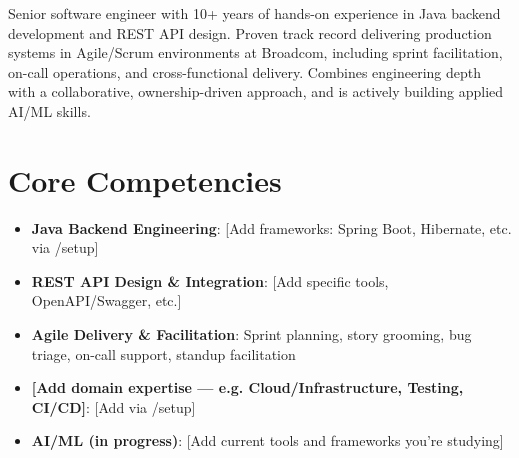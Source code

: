 \documentclass[11pt,a4paper,sans]{moderncv}
\begin{document}
\makecvtitle


\vspace{6pt}
\small{Senior software engineer with 10+ years of hands-on experience in Java backend development and REST API design. Proven track record delivering production systems in Agile/Scrum environments at Broadcom, including sprint facilitation, on-call operations, and cross-functional delivery. Combines engineering depth with a collaborative, ownership-driven approach, and is actively building applied AI/ML skills.}


\section{Core Competencies}
\vspace{1pt}
\begin{itemize}

\item \textbf{Java Backend Engineering}: [Add frameworks: Spring Boot, Hibernate, etc. via /setup]

\item \textbf{REST API Design \& Integration}: [Add specific tools, OpenAPI/Swagger, etc.]

\item \textbf{Agile Delivery \& Facilitation}: Sprint planning, story grooming, bug triage, on-call support, standup facilitation

\item \textbf{[Add domain expertise — e.g. Cloud/Infrastructure, Testing, CI/CD]}: [Add via /setup]

\item \textbf{AI/ML (in progress)}: [Add current tools and frameworks you're studying]

\end{itemize}

\end{document}
